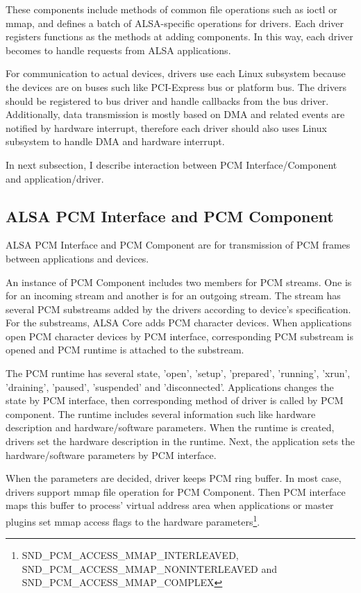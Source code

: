 \documentclass[onecolumn]{article}
\begin{document}
These components include methods of common file operations such as ioctl or mmap, and defines a batch of ALSA-specific operations for drivers. Each driver registers functions as the methods at adding components. In this way, each driver becomes to handle requests from ALSA applications.

For communication to actual devices, drivers use each Linux subsystem because the devices are on buses such like PCI-Express bus or platform bus. The drivers should be registered to bus driver and handle callbacks from the bus driver. Additionally, data transmission is mostly based on DMA and related events are notified by hardware interrupt, therefore each driver should also uses Linux subsystem to handle DMA and hardware interrupt.

In next subsection, I describe interaction between PCM Interface/Component and application/driver.

\subsection{ALSA PCM Interface and PCM Component}
\label{sec:alsa-pcm}

ALSA PCM Interface and PCM Component are for transmission of PCM frames between applications and devices.

An instance of PCM Component includes two members for PCM streams. One is for an incoming stream and another is for an outgoing stream. The stream has several PCM substreams added by the drivers according to device's specification. For the substreams, ALSA Core adds PCM character devices. When applications open PCM character devices by PCM interface, corresponding PCM substream is opened and PCM runtime is attached to the substream.

The PCM runtime has several state, 'open', 'setup', 'prepared', 'running', 'xrun', 'draining', 'paused', 'suspended' and 'disconnected'\cite{alsa-lib}. Applications changes the state by PCM interface, then corresponding method of driver is called by PCM component. The runtime includes several information such like hardware description and hardware/software parameters. When the runtime is created, drivers set the hardware description in the runtime. Next, the application sets the hardware/software parameters by PCM interface.

When the parameters are decided, driver keeps PCM ring buffer. In most case, drivers support mmap file operation for PCM Component. Then PCM interface maps this buffer to process' virtual address area when applications or master plugins set mmap access flags to the hardware parameters\footnote{SND\_PCM\_ACCESS\_MMAP\_INTERLEAVED, SND\_PCM\_ACCESS\_MMAP\_NONINTERLEAVED and SND\_PCM\_ACCESS\_MMAP\_COMPLEX}.
\end{document}
